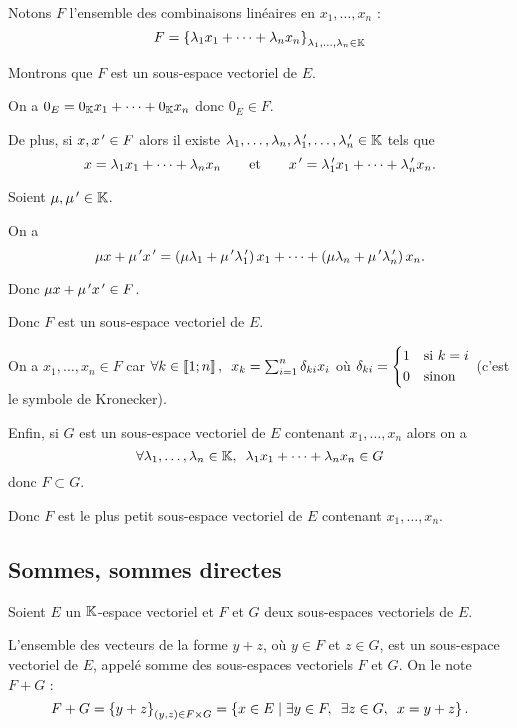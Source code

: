 \begin{dem}
Notons \(F\) l'ensemble des combinaisons linéaires en \(x_1,\dots,x_n\) : \[F=\left\lbrace\lambda_1x_1+\dots+\lambda_nx_n\right\rbrace_{\lambda_1,\dots,\lambda_n\in\mathbb{K}}\]

Montrons que \(F\) est un sous-espace vectoriel de \(E\).

On a \(0_E=0_{\mathbb{K}} x_1+\dots+0_{\mathbb{K}} x_n\) donc \(0_E\in F\).

De plus, si \(x,x^{\,\prime}\in F\) alors il existe \(\lambda_1,\dots,\lambda_n,\lambda_1^{\,\prime},\dots,\lambda_n^{\,\prime}\in\mathbb{K}\) tels que \[x=\lambda_1x_1+\dots+\lambda_nx_n\qquad\text{et}\qquad x^{\,\prime}=\lambda_1^{\,\prime} x_1+\dots+\lambda_n^{\,\prime} x_n.\]

Soient \(\mu,\mu^{\,\prime}\in\mathbb{K}\).

On a \[\mu x+\mu^{\,\prime} x^{\,\prime}=\left(\mu\lambda_1+\mu^{\,\prime}\lambda_1^{\,\prime}\right)x_1+\dots+\left(\mu\lambda_n+\mu^{\,\prime}\lambda_n^{\,\prime}\right)x_n.\]

Donc \(\mu x+\mu^{\,\prime} x^{\,\prime}\in F\).

Donc \(F\) est un sous-espace vectoriel de \(E\).

On a \(x_1,\dots,x_n\in F\) car \(\quantifs{\forall k\in\interventierii{1}{n}}x_k=\sum_{i=1}^n\delta_{ki}x_i\) où \(\delta_{ki}=\begin{dcases}1 &\text{si }k=i \\ 0 &\text{sinon}\end{dcases}\) (c'est le symbole de Kronecker).

Enfin, si \(G\) est un sous-espace vectoriel de \(E\) contenant \(x_1,\dots,x_n\) alors on a \[\quantifs{\forall\lambda_1,\dots,\lambda_n\in\K}\lambda_1x_1+\dots+\lambda_nx_n\in G\] donc \(F\subset G\).

Donc \(F\) est le plus petit sous-espace vectoriel de \(E\) contenant \(x_1,\dots,x_n\).
\end{dem}

\subsection{Sommes, sommes directes}

\begin{defprop}
Soient \(E\) un \(\mathbb{K}\)-espace vectoriel et \(F\) et \(G\) deux sous-espaces vectoriels de \(E\).

L'ensemble des vecteurs de la forme \(y+z\), où \(y\in F\) et \(z\in G\), est un sous-espace vectoriel de \(E\), appelé somme des sous-espaces vectoriels \(F\) et \(G\). On le note \(F+G\) : \[F+G=\accol{y+z}_{\paren{y,z}\in F\times G}=\accol{x\in E\tq\quantifs{\exists y\in F;\exists z\in G}x=y+z}.\]
\end{defprop}

